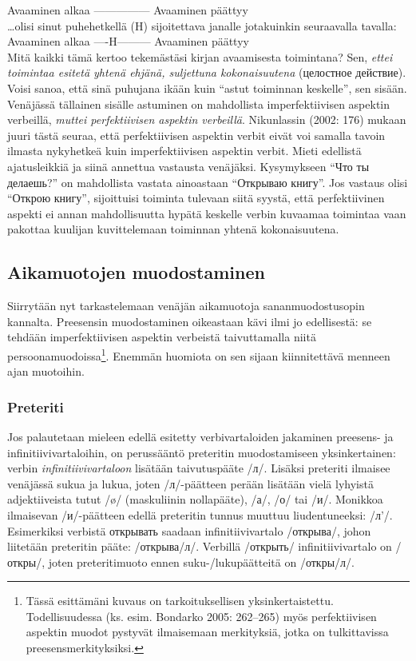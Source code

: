 \documentclass[]{scrartcl}
\begin{document}
Avaaminen alkaa \textbar{}---------------\textbar{} Avaaminen päättyy\\

\ldots{}olisi sinut puhehetkellä (H) sijoitettava janalle jotakuinkin
seuraavalla tavalla:\\

Avaaminen alkaa \textbar{}----H---------\textbar{} Avaaminen päättyy\\

Mitä kaikki tämä kertoo tekemästäsi kirjan avaamisesta toimintana? Sen,
\emph{ettei toimintaa esitetä yhtenä ehjänä, suljettuna kokonaisuutena}
(целостное действие). Voisi sanoa, että sinä puhujana ikään kuin ``astut
toiminnan keskelle'', sen sisään. Venäjässä tällainen sisälle astuminen
on mahdollista imperfektiivisen aspektin verbeillä, \emph{muttei
perfektiivisen aspektin verbeillä}. Nikunlassin (2002: 176) mukaan juuri
tästä seuraa, että perfektiivisen aspektin verbit eivät voi samalla
tavoin ilmasta nykyhetkeä kuin imperfektiivisen aspektin verbit. Mieti
edellistä ajatusleikkiä ja siinä annettua vastausta venäjäksi.
Kysymykseen ``Что ты делаешь?'' on mahdollista vastata ainoastaan
``Открываю книгу''. Jos vastaus olisi ``Открою книгу'', sijoittuisi
toiminta tulevaan siitä syystä, että perfektiivinen aspekti ei annan
mahdollisuutta hypätä keskelle verbin kuvaamaa toimintaa vaan pakottaa
kuulijan kuvittelemaan toiminnan yhtenä kokonaisuutena.

\subsection{Aikamuotojen
muodostaminen}\label{aikamuotojen-muodostaminen}

Siirrytään nyt tarkastelemaan venäjän aikamuotoja sananmuodostusopin
kannalta. Preesensin muodostaminen oikeastaan kävi ilmi jo edellisestä:
se tehdään imperfektiivisen aspektin verbeistä taivuttamalla niitä
persoonamuodoissa\footnote{Tässä esittämäni kuvaus on tarkoituksellisen
  yksinkertaistettu. Todellisuudessa (ks. esim. Bondarko 2005: 262--265)
  myös perfektiivisen aspektin muodot pystyvät ilmaisemaan merkityksiä,
  jotka on tulkittavissa preesensmerkityksiksi.}. Enemmän huomiota on
sen sijaan kiinnitettävä menneen ajan muotoihin.

\subsubsection{Preteriti}\label{preteriti}

Jos palautetaan mieleen edellä esitetty verbivartaloiden jakaminen
preesens- ja infinitiivivartaloihin, on perussääntö preteritin
muodostamiseen yksinkertainen: verbin \emph{infinitiivivartaloon}
lisätään taivutuspääte /л/. Lisäksi preteriti ilmaisee venäjässä sukua
ja lukua, joten /л/-päätteen perään lisätään vielä lyhyistä
adjektiiveista tutut /ø/ (maskuliinin nollapääte), /а/, /о/ tai /и/.
Monikkoa ilmaisevan /и/-päätteen edellä preteritin tunnus muuttuu
liudentuneeksi: /л'/. Esimerkiksi verbistä открывать saadaan
infinitiivivartalo /открыва/, johon liitetään preteritin pääte:
/открыва/л/. Verbillä /открыть/ infinitiivivartalo on /откры/, joten
preteritimuoto ennen suku-/lukupäätteitä on /откры/л/.
\end{document}
